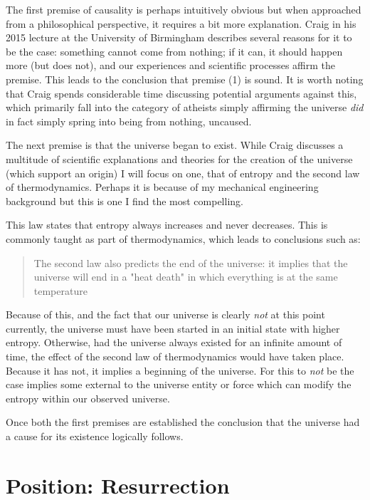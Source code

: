 \documentclass[12pt]{turabian-researchpaper}
\begin{document}
The first premise of causality is perhaps intuitively obvious but when approached from a philosophical perspective, it requires a bit more explanation. Craig in his 2015 lecture at the University of Birmingham describes several reasons for it to be the case: something cannot come from nothing; if it can, it should happen more (but does not), and our experiences and scientific processes affirm the premise.\autocite{craig2015} This leads to the conclusion that premise (1) is sound. It is worth noting that Craig spends considerable time discussing potential arguments against this, which primarily fall into the category of atheists simply affirming the universe \textit{did} in fact simply spring into being from nothing, uncaused.

The next premise is that the universe began to exist. While Craig discusses a multitude of scientific explanations and theories for the creation of the universe (which support an origin) I will focus on one, that of entropy and the second law of thermodynamics. Perhaps it is because of my mechanical engineering background but this is one I find the most compelling.

This law states that entropy always increases and never decreases. This is commonly taught as part of thermodynamics, which leads to conclusions such as:\autocite{duffy1999}

\begin{quotation}
The second law also predicts the end of the universe: it implies that the universe will end in a "heat death" in which everything is at the same temperature
\end{quotation}

Because of this, and the fact that our universe is clearly \textit{not} at this point currently, the universe must have been started in an initial state with higher entropy. Otherwise, had the universe always existed for an infinite amount of time, the effect of the second law of thermodynamics would have taken place. Because it has not, it implies a beginning of the universe. For this to \textit{not} be the case implies some external to the universe entity or force which can modify the entropy within our observed universe.

Once both the first premises are established the conclusion that the universe had a cause for its existence logically follows.

\section{Position: Resurrection} 
\end{document}
